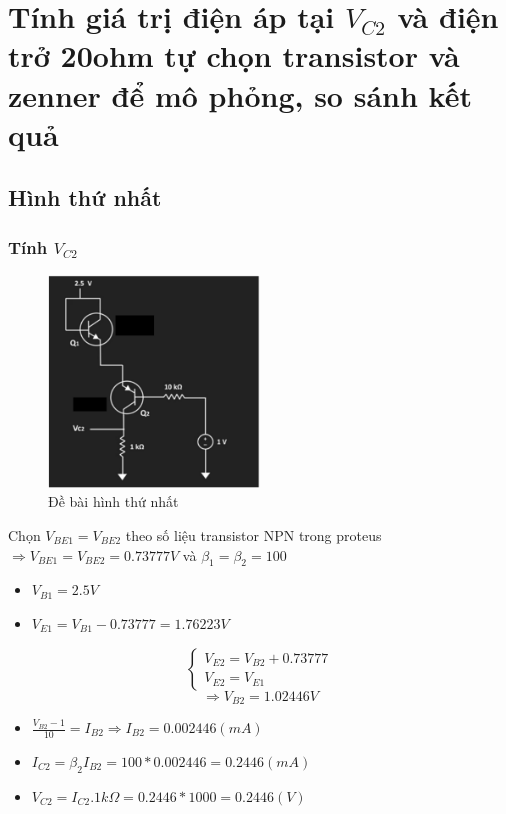 \cleardoublepage
\section{Tính giá trị điện áp tại $V_{C2}$ và điện trở 20ohm tự chọn transistor và zenner để mô phỏng, so sánh kết quả}
    \subsection{Hình thứ nhất}
    \subsubsection{Tính $V_{C2}$}
    \begin{figure}[H]
        \centering
        \includegraphics[width=0.5\textwidth]{pictures/topic5_a.png}
        \caption{Đề bài hình thứ nhất}					
    \end{figure}
    Chọn $V_{BE1} = V_{BE2}$ theo số liệu transistor NPN trong proteus \\
    $\Rightarrow V_{BE1} = V_{BE2} = 0.73777V$ và $\beta _1 = \beta _2 = 100$\\
    \begin{itemize}
        \item $V_{B1} = 2.5V$
        \item $V_{E1} = V_{B1} - 0.73777 = 1.76223V$
    \end{itemize}
    \[
    \begin{cases}
        V_{E2} = V_{B2} + 0.73777 \\
        V_{E2} = V_{E1}
    \end{cases}
    \]
    \[
        \Rightarrow V_{B2} = 1.02446V
    \]
    \begin{itemize}
        \item $\frac{V_{B2}-1}{10} = I_{B2} \Rightarrow I_{B2} = 0.002446(mA)$  
        \item $I_{C2} = \beta _2 I_{B2} = 100*0.002446 = 0.2446 (mA)$ 
        \item $V_{C2} = I_{C2}.1k\Omega  = 0.2446*1000 = 0.2446 (V)$
    \end{itemize}
